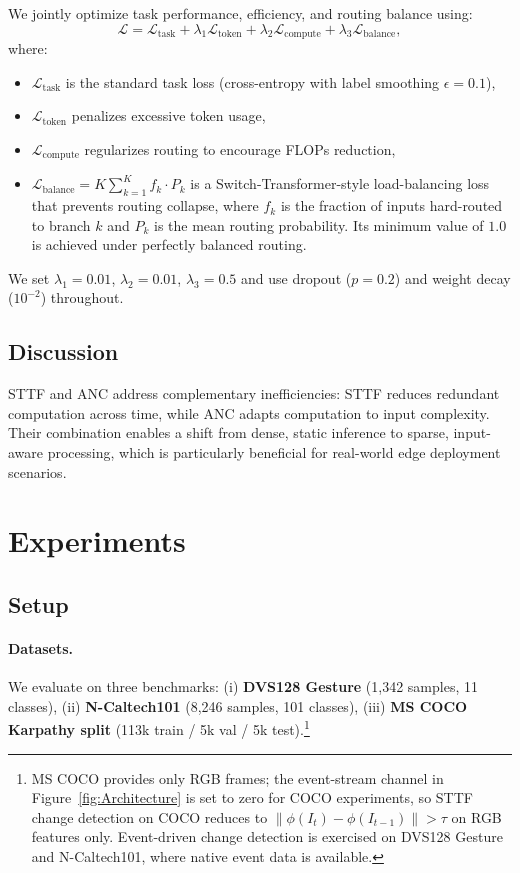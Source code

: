\documentclass{article}
\begin{document}
We jointly optimize task performance, efficiency, and routing balance using:
\begin{equation}
\mathcal{L} = \mathcal{L}_{\text{task}} + \lambda_1 \mathcal{L}_{\text{token}} + \lambda_2 \mathcal{L}_{\text{compute}} + \lambda_3 \mathcal{L}_{\text{balance}},
\end{equation}
where:
\begin{itemize}
    \item $\mathcal{L}_{\text{task}}$ is the standard task loss (cross-entropy with label smoothing $\epsilon=0.1$),
    \item $\mathcal{L}_{\text{token}}$ penalizes excessive token usage,
    \item $\mathcal{L}_{\text{compute}}$ regularizes routing to encourage FLOPs reduction,
    \item $\mathcal{L}_{\text{balance}} = K \sum_{k=1}^{K} f_k \cdot P_k$ is a Switch-Transformer-style load-balancing loss~\cite{fedus2022switch} that prevents routing collapse, where $f_k$ is the fraction of inputs hard-routed to branch $k$ and $P_k$ is the mean routing probability. Its minimum value of $1.0$ is achieved under perfectly balanced routing.
\end{itemize}
We set $\lambda_1 = 0.01$, $\lambda_2 = 0.01$, $\lambda_3 = 0.5$ and use dropout ($p=0.2$) and weight decay ($10^{-2}$) throughout.

\subsection{Discussion}

STTF and ANC address complementary inefficiencies: STTF reduces redundant computation across time, while ANC adapts computation to input complexity. Their combination enables a shift from dense, static inference to sparse, input-aware processing, which is particularly beneficial for real-world edge deployment scenarios.

\section{Experiments}

\subsection{Setup}

\paragraph{Datasets.}
We evaluate on three benchmarks:
(i) \textbf{DVS128 Gesture} (1,342 samples, 11 classes),
(ii) \textbf{N-Caltech101} (8,246 samples, 101 classes),
(iii) \textbf{MS COCO Karpathy split} (113k train / 5k val / 5k test).\footnote{MS COCO provides only RGB frames; the event-stream channel in Figure~\ref{fig:Architecture} is set to zero for COCO experiments, so STTF change detection on COCO reduces to $\|\phi(I_t)-\phi(I_{t-1})\|>\tau$ on RGB features only. Event-driven change detection is exercised on DVS128 Gesture and N-Caltech101, where native event data is available.}
\end{document}
